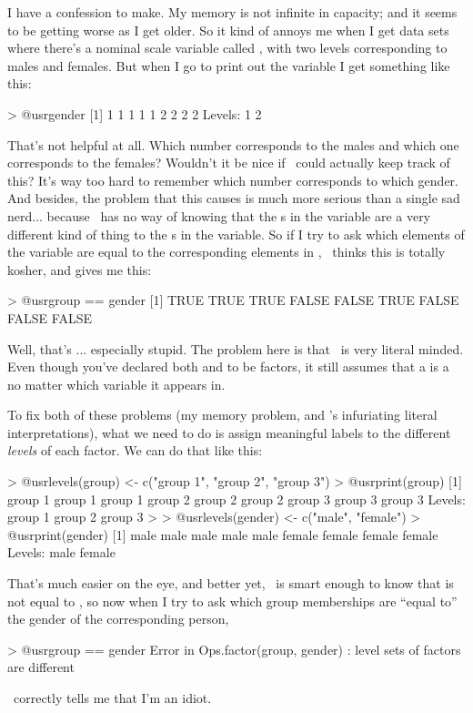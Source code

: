 I have a confession to make. My memory is not infinite in capacity; and it seems to be getting worse as I get older. So it kind of annoys me when I get data sets where there's a nominal scale variable called , with two levels corresponding to males and females. But when I go to print out the variable I get something like this:
\begin{rblock1}
> @usr{gender}
[1] 1 1 1 1 1 2 2 2 2
Levels: 1 2
\end{rblock1}
That's not helpful at all. Which number corresponds to the males and which one corresponds to the females? Wouldn't it be nice if \R\ could actually keep track of this? It's way too hard to remember which number corresponds to which gender. And besides, the problem that this causes is much more serious than a single sad nerd... because \R\ has no way of knowing that the s in the  variable are a very different kind of thing to the s in the  variable. So if I try to ask which elements of the  variable are equal to the corresponding elements in , \R\ thinks this is totally kosher, and gives me this:
\begin{rblock1}
> @usr{group == gender}
[1]  TRUE  TRUE  TRUE FALSE FALSE  TRUE FALSE FALSE FALSE
\end{rblock1}
Well, that's ... especially stupid.  The problem here is that \R\ is very literal minded. Even though you've declared both  and  to be factors, it still assumes that a  is a  no matter which variable it appears in. 

To fix both of these problems (my memory problem, and \R's infuriating literal interpretations), what we need to do is assign meaningful labels to the different {\it levels} of each factor. We can do that like this:
\begin{rblock1}
> @usr{levels(group) <- c("group 1", "group 2", "group 3")}
> @usr{print(group)}
[1] group 1 group 1 group 1 group 2 group 2 group 2 group 3 group 3 group 3
Levels: group 1 group 2 group 3
> 
> @usr{levels(gender) <- c("male", "female")}
> @usr{print(gender)}
[1] male   male   male   male   male   female female female female
Levels: male female
\end{rblock1}
That's much easier on the eye, and better yet, \R\ is smart enough to know that  is not equal to , so now when I try to ask which group memberships are ``equal to'' the gender of the corresponding person, 
\begin{rblock1}
> @usr{group == gender}
Error in Ops.factor(group, gender) : level sets of factors are different
\end{rblock1}
\R\ correctly tells me that I'm an idiot.


